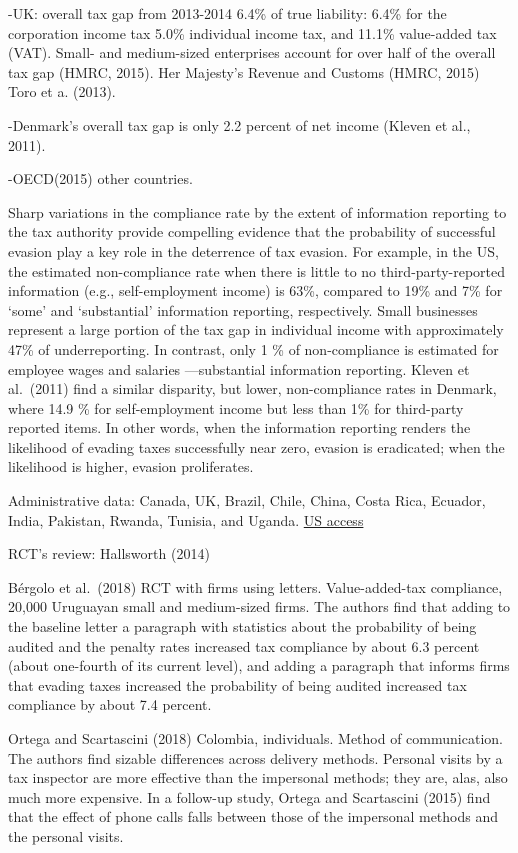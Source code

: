 \documentclass[
  12pt]{article}
\theoremstyle{definition}
\theoremstyle{remark}
\begin{document}
-UK: overall tax gap from 2013-2014 6.4\% of true liability: 6.4\% for
the corporation income tax 5.0\% individual income tax, and 11.1\%
value-added tax (VAT). Small- and medium-sized enterprises account for
over half of the overall tax gap (HMRC, 2015). Her Majesty's Revenue and
Customs (HMRC, 2015) Toro et a. (2013).

-Denmark's overall tax gap is only 2.2 percent of net income (Kleven et
al., 2011).

-OECD(2015) other countries.

Sharp variations in the compliance rate by the extent of information
reporting to the tax authority provide compelling evidence that the
probability of successful evasion play a key role in the deterrence of
tax evasion. For example, in the US, the estimated non-compliance rate
when there is little to no third-party-reported information (e.g.,
self-employment income) is 63\%, compared to 19\% and 7\% for `some' and
`substantial' information reporting, respectively. Small businesses
represent a large portion of the tax gap in individual income with
approximately 47\% of underreporting. In contrast, only 1 \% of
non-compliance is estimated for employee wages and salaries
---substantial information reporting. Kleven et al.~(2011) find a
similar disparity, but lower, non-compliance rates in Denmark, where
14.9 \% for self-employment income but less than 1\% for third-party
reported items. In other words, when the information reporting renders
the likelihood of evading taxes successfully near zero, evasion is
eradicated; when the likelihood is higher, evasion proliferates.

Administrative data: Canada, UK, Brazil, Chile, China, Costa Rica,
Ecuador, India, Pakistan, Rwanda, Tunisia, and Uganda.
\href{https://www.irs.gov/pub/irs-soi/16jsrpprojects.pdf}{US access}

RCT's review: Hallsworth (2014)

Bérgolo et al.~(2018) RCT with firms using letters. Value-added-tax
compliance, 20,000 Uruguayan small and medium-sized firms. The authors
find that adding to the baseline letter a paragraph with statistics
about the probability of being audited and the penalty rates increased
tax compliance by about 6.3 percent (about one-fourth of its current
level), and adding a paragraph that informs firms that evading taxes
increased the probability of being audited increased tax compliance by
about 7.4 percent.

Ortega and Scartascini (2018) Colombia, individuals. Method of
communication. The authors find sizable differences across delivery
methods. Personal visits by a tax inspector are more effective than the
impersonal methods; they are, alas, also much more expensive. In a
follow-up study, Ortega and Scartascini (2015) find that the effect of
phone calls falls between those of the impersonal methods and the
personal visits.
\end{document}
